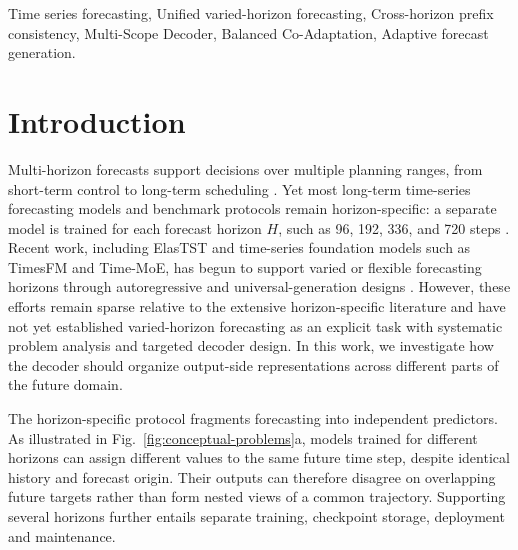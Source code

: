 \documentclass[final,3p,times]{elsarticle}
\newif\ifshowrevisions
\newcommand{\rev}[1]{\ifshowrevisions\textcolor{revisionblue}{#1}\else#1\fi}
\begin{document}
\begin{frontmatter}
\begin{keyword}
Time series forecasting,
Unified varied-horizon forecasting,
Cross-horizon prefix consistency,
\rev{Multi-Scope Decoder},
\rev{Balanced Co-Adaptation},
Adaptive forecast generation.
\end{keyword}

\end{frontmatter}




\section{Introduction}
\label{sec:introduction}


Multi-horizon forecasts support decisions over multiple planning ranges, from short-term control to long-term scheduling \citep{zeng2023dlinear}. Yet most long-term time-series forecasting models and benchmark protocols remain horizon-specific: a separate model is trained for each forecast horizon $H$, such as 96, 192, 336, and 720 steps \citep{nie2023patchtst,liu2024itransformer}. Recent work, including ElasTST\citep{zhang2024elastst} and time-series foundation models such as TimesFM\citep{das2024timesfm} and Time-MoE\citep{shi2025timemoe}, has begun to support varied or flexible forecasting horizons through autoregressive and universal-generation designs \citep{liu2024timer,ansari2024chronos,woo2024moirai}. However, these efforts remain sparse relative to the extensive horizon-specific literature and have not yet established varied-horizon forecasting as an explicit task with systematic problem analysis and targeted decoder design. In this work, we investigate how the decoder should organize output-side representations across different parts of the future domain.

The horizon-specific protocol fragments forecasting into independent predictors. As illustrated in Fig.~\ref{fig:conceptual-problems}a, models trained for different horizons can assign different values to the same future time step, despite identical history and forecast origin. Their outputs can therefore disagree on overlapping future targets rather than form nested views of a common trajectory. Supporting several horizons further entails separate training, checkpoint storage, deployment and maintenance.
\end{document}

